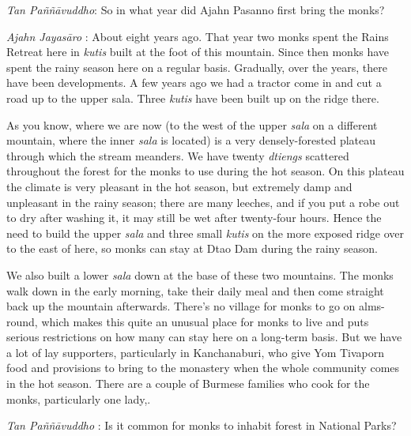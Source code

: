 \emph{Tan Paññāvuddho}: So in what year did Ajahn Pasanno first bring
the monks?

\emph{Ajahn Jayasāro }: About eight years ago. That year two monks spent
the Rains Retreat here in \emph{kutis} built at the foot of this
mountain. Since then monks have spent the rainy season here on a regular
basis. Gradually, over the years, there have been developments. A few
years ago we had a tractor come in and cut a road up to the upper sala.
Three \emph{kutis} have been built up on the ridge there.

As you know, where we are now (to the west of the upper \emph{sala} on a
different mountain, where the inner \emph{sala} is located) is a very
densely-forested plateau through which the stream meanders. We have
twenty \emph{dtiengs} scattered throughout the forest for the monks to
use during the hot season. On this plateau the climate is very pleasant
in the hot season, but extremely damp and unpleasant in the rainy
season; there are many leeches, and if you put a robe out to dry after
washing it, it may still be wet after twenty-four hours. Hence the need
to build the upper \emph{sala} and three small \emph{kutis} on the more
exposed ridge over to the east of here, so monks can stay at Dtao Dam
during the rainy season.

We also built a lower \emph{sala} down at the base of these two
mountains. The monks walk down in the early morning, take their daily
meal and then come straight back up the mountain afterwards. There's no
village for monks to go on alms-round, which makes this quite an unusual
place for monks to live and puts serious restrictions on how many can
stay here on a long-term basis. But we have a lot of lay supporters,
particularly in Kanchanaburi, who give Yom Tivaporn food and provisions
to bring to the monastery when the whole community comes in the hot
season. There are a couple of Burmese families who cook for the monks,
particularly one lady,.

\emph{Tan Paññāvuddho} : Is it common for monks to inhabit forest in
National Parks?

